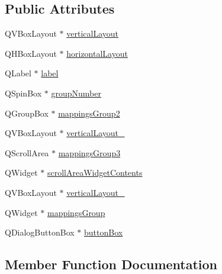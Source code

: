 \subsection*{Public Attributes}
\begin{DoxyCompactItemize}
\item 
Q\+V\+Box\+Layout $\ast$ \mbox{\hyperlink{class_ui___node_mappings_dialog_a7d6e2db44f4b87065935392e4a80e8b1}{vertical\+Layout}}
\item 
Q\+H\+Box\+Layout $\ast$ \mbox{\hyperlink{class_ui___node_mappings_dialog_ac30337a62941320da122377e1b6e090a}{horizontal\+Layout}}
\item 
Q\+Label $\ast$ \mbox{\hyperlink{class_ui___node_mappings_dialog_a752c5d52639dfc9dbc2b0f0d52f9c602}{label}}
\item 
Q\+Spin\+Box $\ast$ \mbox{\hyperlink{class_ui___node_mappings_dialog_a4c57a4fa630a8f8e5c98ae68656a4532}{group\+Number}}
\item 
Q\+Group\+Box $\ast$ \mbox{\hyperlink{class_ui___node_mappings_dialog_a93223e0bdc408fe7f26ca4c5b9dc22b4}{mappings\+Group2}}
\item 
Q\+V\+Box\+Layout $\ast$ \mbox{\hyperlink{class_ui___node_mappings_dialog_aa13e4fcfbe4ec9ef2b90fd1f22e79aef}{vertical\+Layout\+\_}}
\item 
Q\+Scroll\+Area $\ast$ \mbox{\hyperlink{class_ui___node_mappings_dialog_a3e948fde8e14d97cc0007cecaff3473d}{mappings\+Group3}}
\item 
Q\+Widget $\ast$ \mbox{\hyperlink{class_ui___node_mappings_dialog_a4bf719c83524f64942ca7e44280aebbe}{scroll\+Area\+Widget\+Contents}}
\item 
Q\+V\+Box\+Layout $\ast$ \mbox{\hyperlink{class_ui___node_mappings_dialog_a2e6297b6d6c5657f7dca4f237f0bad1e}{vertical\+Layout\+\_}}
\item 
Q\+Widget $\ast$ \mbox{\hyperlink{class_ui___node_mappings_dialog_a8f60c2f54e38c5b65f6aed02d9ae0f56}{mappings\+Group}}
\item 
Q\+Dialog\+Button\+Box $\ast$ \mbox{\hyperlink{class_ui___node_mappings_dialog_ae14f5d0a7587169bec8cd1b45cf91892}{button\+Box}}
\end{DoxyCompactItemize}


\subsection{Member Function Documentation}
\mbox{\label{class_ui___node_mappings_dialog_ac06af93662762f4a913745df44b89a37}} 
